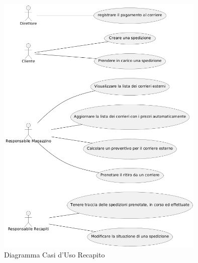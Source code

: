 \documentclass[a4paper,12pt]{article}
\begin{document}
\begin{figure}[H]
  \centering
  \includegraphics[width=10cm]{assets/usecase_recapito_4.png}
  \caption{Diagramma Casi d'Uso Recapito}
\end{figure}
\end{document}
